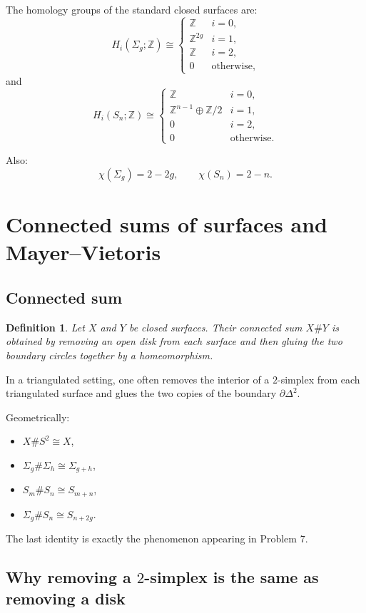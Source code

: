 \documentclass[12pt,a4paper]{article}
\newcommand{\Z}{\mathbb{Z}}
\newcommand{\Chi}{\chi}
\theoremstyle{notespace}
\newtheorem{definition}{Definition}[section]
\begin{document}
	The homology groups of the standard closed surfaces are:
	\[
	H_i(\Sigma_g;\Z)\cong
	\begin{cases}
		\Z & i=0,\\
		\Z^{2g} & i=1,\\
		\Z & i=2,\\
		0 & \text{otherwise},
	\end{cases}
	\]
	and
	\[
	H_i(S_n;\Z)\cong
	\begin{cases}
		\Z & i=0,\\
		\Z^{n-1}\oplus \Z/2 & i=1,\\
		0 & i=2,\\
		0 & \text{otherwise}.
	\end{cases}
	\]
	
	Also:
	\[
	\Chi(\Sigma_g)=2-2g,\qquad \Chi(S_n)=2-n.
	\]
	
	\section{Connected sums of surfaces and Mayer--Vietoris}
	
	\subsection{Connected sum}
	
	\begin{definition}
		Let $X$ and $Y$ be closed surfaces. Their \emph{connected sum} $X\#Y$ is obtained by removing an open disk from each surface and then gluing the two boundary circles together by a homeomorphism.
	\end{definition}
	
	In a triangulated setting, one often removes the interior of a $2$-simplex from each triangulated surface and glues the two copies of the boundary $\partial\Delta^2$.
	
	Geometrically:
	\begin{itemize}[leftmargin=2em]
		\item $X\#S^2\cong X$,
		\item $\Sigma_g\#\Sigma_h\cong \Sigma_{g+h}$,
		\item $S_m\#S_n\cong S_{m+n}$,
		\item $\Sigma_g\#S_n\cong S_{n+2g}$.
	\end{itemize}
	
	The last identity is exactly the phenomenon appearing in Problem 7.
	
	\subsection{Why removing a $2$-simplex is the same as removing a disk}
	
\end{document}
